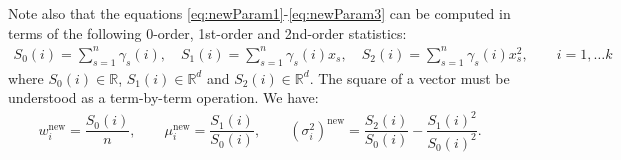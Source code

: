 \documentclass[a4paper,10pt]{article}
\begin{document}
Note also that the equations \ref{eq:newParam1}-\ref{eq:newParam3} can be computed in terms of the following 0-order, 1st-order and 2nd-order statistics:
\begin{align*}
S_0(i)=\sum_{s=1}^n \gamma_s(i), \quad
S_1(i) =\sum_{s=1}^n\gamma_s(i) x_s, \quad
S_2 (i) =\sum_{s=1}^n \gamma_s(i)  x_s^2, \qquad i=1, \dots k
\end{align*}
where $S_0(i) \in \mathbb{R}$, $S_1(i) \in \mathbb{R}^d$ and $S_2(i) \in \mathbb{R}^d$. The square of a vector must be understood as a term-by-term operation.
We have:
\begin{align}
w_i^{\text{new}}=\dfrac{S_0(i)}{n}, \qquad
\mu_i^{\text{new}}=\dfrac{S_1(i)}{S_0(i)},  \qquad
(\sigma^2_i)^{\text{new}}=%
\dfrac{S_2(i)}{S_0(i)}-\dfrac{S_1(i)^2}{S_0(i)^2} .
\end{align}

%
\end{document}
